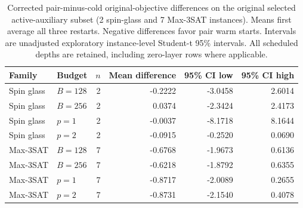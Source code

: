 \begin{table}[tb]
\centering
\small
\begin{tabular}{llrrrr}
\hline
Family & Budget & $n$ & Mean difference & 95\% CI low & 95\% CI high \\
\hline
Spin glass & $B=128$ & 2 & -0.2222 & -3.0458 & 2.6014 \\
Spin glass & $B=256$ & 2 & 0.0374 & -2.3424 & 2.4173 \\
Spin glass & $p=1$ & 2 & -0.0037 & -8.1718 & 8.1644 \\
Spin glass & $p=2$ & 2 & -0.0915 & -0.2520 & 0.0690 \\
Max-3SAT & $B=128$ & 7 & -0.6768 & -1.9673 & 0.6136 \\
Max-3SAT & $B=256$ & 7 & -0.6218 & -1.8792 & 0.6355 \\
Max-3SAT & $p=1$ & 7 & -0.8717 & -2.0089 & 0.2655 \\
Max-3SAT & $p=2$ & 7 & -0.8731 & -2.1540 & 0.4078 \\
\hline
\end{tabular}
\caption{Corrected pair-minus-cold original-objective differences on the original selected active-auxiliary subset (2 spin-glass and 7 Max-3SAT instances). Means first average all three restarts. Negative differences favor pair warm starts. Intervals are unadjusted exploratory instance-level Student-t 95\% intervals. All scheduled depths are retained, including zero-layer rows where applicable.}
\label{tab:original_e4-warmstart-coordinate-corrected}
\end{table}
